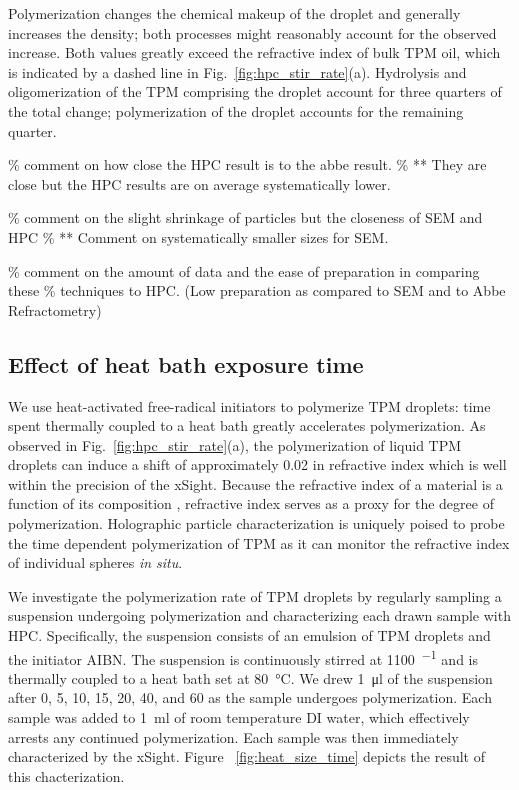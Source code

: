 Polymerization changes the chemical makeup of the droplet and generally increases the
density; %
both processes might reasonably account for the observed increase.
Both values greatly exceed the refractive index of bulk TPM oil, which is indicated by
a dashed line in Fig.~\ref{fig:hpc_stir_rate}(a).
Hydrolysis and oligomerization of the TPM comprising the droplet account for three quarters of
the total change; polymerization of the droplet accounts for the remaining quarter.

\% comment on how close the HPC result is to the abbe result.
\%  ** They are close but the HPC results are on average systematically lower.

\% comment on the slight shrinkage of particles but the closeness of SEM and HPC
\%  ** Comment on systematically smaller sizes for SEM.

\% comment on the amount of data and the ease of preparation in comparing these
\% techniques to HPC. (Low preparation as compared to SEM and to Abbe Refractometry)

\subsection{Effect of heat bath exposure time}

We use heat-activated free-radical initiators to polymerize TPM droplets:
time spent thermally coupled to a heat bath greatly accelerates polymerization. 
As observed in Fig.~\ref{fig:hpc_stir_rate}(a), the polymerization of
liquid TPM droplets can induce a shift of approximately \SI{0.02}{} in refractive index
which is well within the precision of the xSight.  Because the refractive index
of a material is a function of its composition \cite{wang15},
refractive index serves as a proxy for the degree of polymerization.
Holographic particle characterization is uniquely poised to probe the time dependent
polymerization of TPM as it can monitor the refractive index of individual spheres
\emph{in situ}.

We investigate the polymerization rate of TPM droplets by regularly sampling a
suspension undergoing polymerization and characterizing each drawn sample with HPC.
Specifically, the suspension consists of an emulsion of TPM droplets
and the initiator AIBN. The suspension is continuously stirred at \SI{1100}{\min^{-1}}
and is thermally coupled to a heat bath set at \SI{80}{\degreeCelsius}.
We drew \SI{1}{\ul} of the suspension after \num{0}, \num{5}, \num{10}, \num{15},
\num{20}, \num{40}, and \SI{60}{\min} as the sample undergoes polymerization.
Each sample was added to \SI{1}{\ml} of room temperature DI water, which effectively
arrests any continued polymerization.
Each sample was then immediately characterized by the xSight. Figure ~\ref{fig:heat_size_time}
depicts the result of this chacterization.

